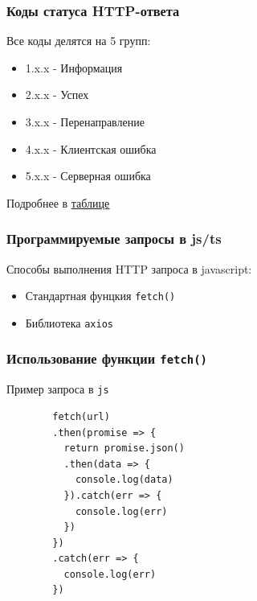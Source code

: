 \documentclass[aspectratio=169]{beamer}
\begin{document}

\begin{frame}
  \frametitle{Коды статуса HTTP-ответа}
  \begin{center}
    Все коды делятся на 5 групп:
  \end{center}
  
  \begin{itemize}
  \item 1.x.x - Информация
  \item 2.x.x - Успех
  \item 3.x.x - Перенаправление
  \item 4.x.x - Клиентская ошибка
  \item 5.x.x - Серверная ошибка
  \end{itemize}
  
  \begin{center}
    Подробнее в \textcolor{blue}{\underline{\href{assets/codes.png}{таблице}}}
  \end{center}
  
\end{frame}


\begin{frame}
  \frametitle{Программируемые запросы в js/ts}
  \begin{center}
    Способы выполнения HTTP запроса в javascript:
  \end{center}
  \begin{itemize}
  \item Стандартная фунцкия \texttt{fetch()}
  \item Библиотека \texttt{axios}
  \end{itemize}

  
\end{frame}


\begin{frame}[fragile]
  \frametitle{Использование функции \texttt{fetch()}}
  \begin{center}
    \begin{block}{Пример запроса в \texttt{js}}
      \begin{verbatim}
        fetch(url)
        .then(promise => {
          return promise.json()
          .then(data => {
            console.log(data)
          }).catch(err => {
            console.log(err)
          })
        })
        .catch(err => {
          console.log(err)
        })

      \end{verbatim}
    \end{block}
  \end{center}
\end{frame}
\end{document}
